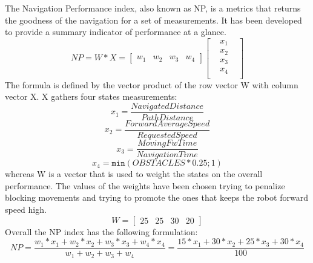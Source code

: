 The Navigation Performance index, also known as NP, is a metrics that returns the goodness of the navigation for a set of measurements. It has been developed to provide a summary indicator of performance at a glance. 
\begin{equation}
        NP = W * X =
    \begin{bmatrix}
            w_{1} & w_{2} & w_{3} & w_{4}
    \end{bmatrix}
    \begin{bmatrix}
        & x_{1} &\\
        & x_{2} &\\
        & x_{3} &\\
        & x_{4} &\\
    \end{bmatrix}
\end{equation}
The formula is defined by the vector product of the row vector W with column vector X.
X gathers four states measurements:
\begin{equation}
    x_{1} = \frac{Navigated Distance}{Path Distance}
\end{equation}
\begin{equation}
    x_{2} = \frac{Forward Average Speed}{Requested Speed}
\end{equation}
\begin{equation}
    x_{3} = \frac{ Moving Fw Time}{ Navigation Time}
\end{equation}
\begin{equation}
    x_{4} = \texttt{min}(OBSTACLES*0.25;1)
\end{equation}
whereas W is a vector that is used to weight the states on the overall performance. The values of the weights have been chosen trying to penalize blocking movements and trying to promote the ones that keeps the robot forward speed high.
\begin{equation}
    W = 
    \begin{bmatrix}
        25 & 25 & 30 & 20
    \end{bmatrix}
\end{equation}
Overall the NP index has the following formulation:
\begin{equation}
    NP = \frac{w_{1}*x_{1}+w_{2}*x_{2}+w_{3}*x_{3}+w_{4}*x_{4} }{w_{1} + w_{2} + w_{3} + w_{4}} 
    = \frac{15*x_{1}+30*x_{2}+25*x_{3}+30*x_{4}}{100}
\end{equation}


